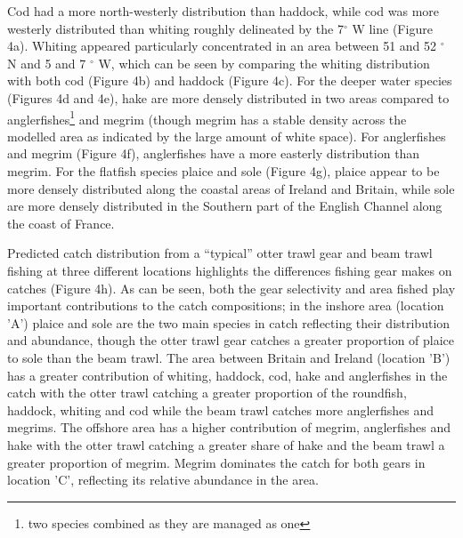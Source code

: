 \documentclass{nature}
\begin{document}
\begin{linenumbers}
Cod had a more north-westerly distribution than
haddock, while cod was more westerly distributed than whiting roughly
delineated by the 7$^{\circ}$ W line (Figure 4a). Whiting appeared particularly
concentrated in an area between 51 and 52 $^{\circ}$ N and 5 and 7 $^{\circ}$
W, which can be seen by comparing the whiting distribution with both cod
(Figure 4b) and haddock (Figure 4c). For the deeper water species (Figures 4d
and 4e), hake are more densely distributed in two areas compared to
anglerfishes\footnote{two species combined as they are managed as one} and
megrim (though megrim has a stable density across the modelled area as
indicated by the large amount of white space). For anglerfishes and megrim
(Figure 4f), anglerfishes have a more easterly distribution than megrim. For
the flatfish species plaice and sole (Figure 4g), plaice appear to be more
densely distributed along the coastal areas of Ireland and Britain, while sole
are more densely distributed in the Southern part of the English Channel along
the coast of France.

Predicted catch distribution from a ``typical'' otter trawl gear and beam trawl
fishing at three different locations highlights the differences fishing gear
makes on catches (Figure 4h). As can be seen, both the gear selectivity and
area fished play important contributions to the catch compositions; in the
inshore area (location 'A') plaice and sole are the two main species in catch
reflecting their distribution and abundance, though the otter trawl gear
catches a greater proportion of plaice to sole than the beam trawl.  The area
between Britain and Ireland (location 'B') has a greater contribution of
whiting, haddock, cod, hake and anglerfishes in the catch with the otter trawl
catching a greater proportion of the roundfish, haddock, whiting and cod while
the beam trawl catches more anglerfishes and megrims. The offshore area has a
higher contribution of megrim, anglerfishes and hake with the otter trawl
catching a greater share of hake and the beam trawl a greater proportion of
megrim. Megrim dominates the catch for both gears in location 'C', reflecting
its relative abundance in the area.  


\end{linenumbers}
\end{document}
